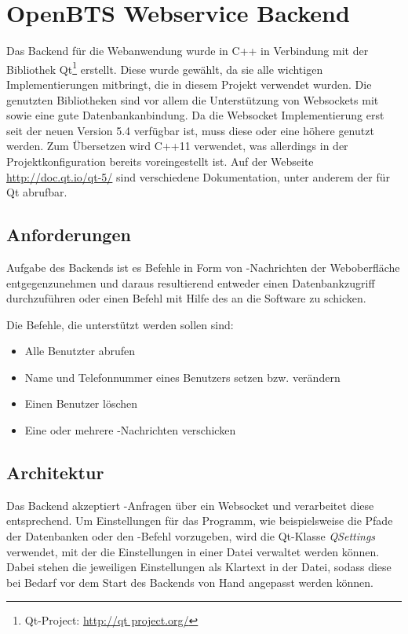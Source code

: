 \section{OpenBTS Webservice Backend}
\label{sec:backend}
Das Backend für die Webanwendung wurde in C++ in Verbindung mit der Bibliothek Qt\footnote{Qt-Project: \url{http://qt project.org/}} erstellt. Diese wurde gewählt, da sie alle wichtigen Implementierungen mitbringt, die in diesem Projekt verwendet wurden. Die genutzten Bibliotheken sind vor allem die Unterstützung von Websockets mit \JSON sowie eine gute Datenbankanbindung. Da die Websocket Implementierung erst seit der neuen Version 5.4 verfügbar ist, muss diese oder eine höhere genutzt werden. Zum Übersetzen wird C++11 verwendet, was allerdings in der Projektkonfiguration bereits voreingestellt ist. Auf der Webseite \url{http://doc.qt.io/qt-5/} sind verschiedene Dokumentation, unter anderem der \API für Qt abrufbar.

\subsection{Anforderungen}

Aufgabe des Backends ist es Befehle in Form von \JSON-Nachrichten der Weboberfläche entgegenzunehmen und daraus resultierend entweder einen Datenbankzugriff durchzuführen oder einen Befehl mit Hilfe des \CLI an die \OpenBTS Software zu schicken.

Die Befehle, die unterstützt werden sollen sind:

\begin{itemize}
	\item Alle Benutzter abrufen
	\item Name und Telefonnummer eines Benutzers setzen bzw. verändern
	\item Einen Benutzer löschen
	\item Eine oder mehrere \SMS-Nachrichten verschicken
\end{itemize}

\subsection{Architektur}

Das Backend akzeptiert \JSON-Anfragen über ein Websocket und verarbeitet diese entsprechend. Um Einstellungen für das Programm, wie beispielsweise die Pfade der Datenbanken oder den \SMS-Befehl vorzugeben, wird die Qt-Klasse \textit{QSettings} verwendet, mit der die Einstellungen in einer Datei verwaltet werden können. Dabei stehen die jeweiligen Einstellungen als Klartext in der Datei, sodass diese bei Bedarf vor dem Start des Backends von Hand angepasst werden können.

